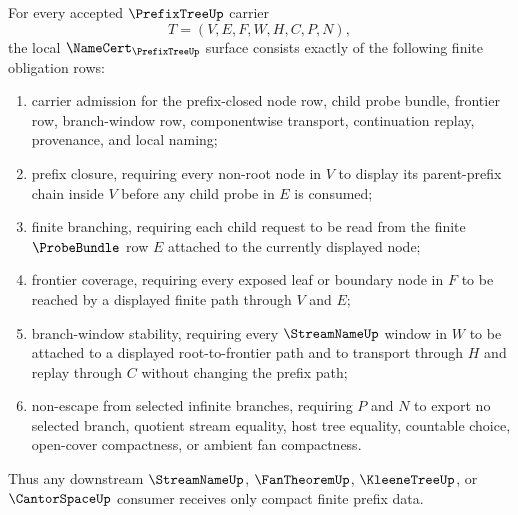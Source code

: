 \begin{theorem}
\label{thm:prefix-tree-frontier-obligation-surface}
For every accepted $\PrefixTreeUp$ carrier
$$
T=(V,E,F,W,H,C,P,N),
$$
the local $\NameCert_{\PrefixTreeUp}$ surface consists exactly of the following finite obligation rows:
\begin{enumerate}
\item carrier admission for the prefix-closed node row, child probe bundle, frontier row, branch-window row, componentwise transport, continuation replay, provenance, and local naming;
\item prefix closure, requiring every non-root node in $V$ to display its parent-prefix chain inside $V$ before any child probe in $E$ is consumed;
\item finite branching, requiring each child request to be read from the finite $\ProbeBundle$ row $E$ attached to the currently displayed node;
\item frontier coverage, requiring every exposed leaf or boundary node in $F$ to be reached by a displayed finite path through $V$ and $E$;
\item branch-window stability, requiring every $\StreamNameUp$ window in $W$ to be attached to a displayed root-to-frontier path and to transport through $H$ and replay through $C$ without changing the prefix path;
\item non-escape from selected infinite branches, requiring $P$ and $N$ to export no selected branch, quotient stream equality, host tree equality, countable choice, open-cover compactness, or ambient fan compactness.
\end{enumerate}
Thus any downstream $\StreamNameUp$, $\FanTheoremUp$, $\KleeneTreeUp$, or $\CantorSpaceUp$ consumer receives only compact finite prefix data.
\end{theorem}
